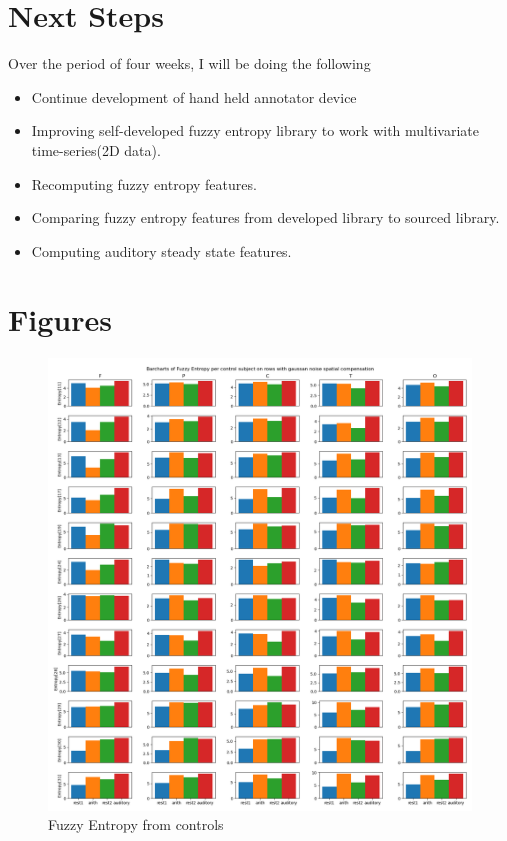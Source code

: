 \documentclass[10pt]{article}
\begin{document}
\section{Next Steps}
Over the period of four weeks, I will be doing the following
\begin{itemize}
  \item Continue development of hand held annotator device
  \item Improving self-developed fuzzy entropy library to work with multivariate
  time-series(2D data).
  \item Recomputing fuzzy entropy features.
  \item Comparing fuzzy entropy features from developed library to sourced library.
  \item Computing auditory steady state features.
\end{itemize}

\section{Figures}\label{sec:figures}
\begin{figure}[H]
  \includegraphics[width=16cm]{../../../data_analysis_results/FuzzEnt/Control/all-fuzzyEntr.png}
  \caption{Fuzzy Entropy from controls}
  \label{fig:controlFuzzEnt}
\end{figure}
\end{document}
